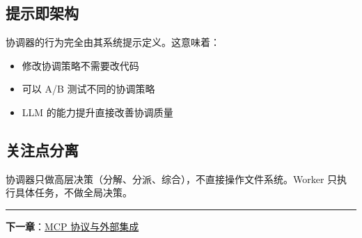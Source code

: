 \subsection{提示即架构}

协调器的行为完全由其系统提示定义。这意味着：
\begin{itemize}[nosep]
  \item 修改协调策略不需要改代码
  \item 可以 A/B 测试不同的协调策略
  \item LLM 的能力提升直接改善协调质量
\end{itemize}

\subsection{关注点分离}

协调器只做高层决策（分解、分派、综合），不直接操作文件系统。Worker 只执行具体任务，不做全局决策。

\bigskip\noindent\rule{\textwidth}{0.4pt}\bigskip

\textbf{下一章}：\href{./chapter-11-mcp.md}{MCP 协议与外部集成}
